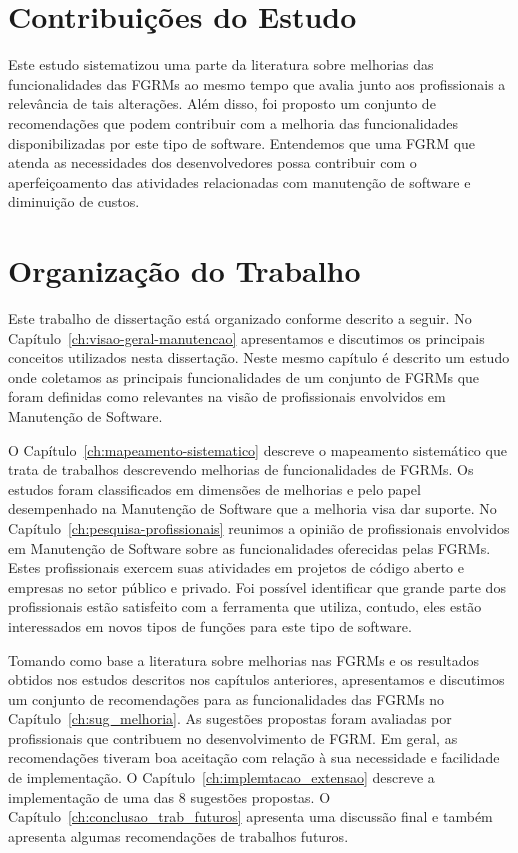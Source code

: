 \section{Contribuições do Estudo}
\label{sec:intro-contribuicao}

Este estudo sistematizou uma parte da literatura sobre melhorias das
funcionalidades das FGRMs ao mesmo tempo que avalia junto aos profissionais a
relevância de tais alterações. Além disso, foi proposto um conjunto de
recomendações que podem contribuir com a melhoria das funcionalidades
disponibilizadas por este tipo de software. Entendemos que uma FGRM que atenda
as necessidades dos desenvolvedores possa contribuir com o aperfeiçoamento das
atividades relacionadas com manutenção de software e diminuição de custos.

\section{Organização do Trabalho}
\label{sec:intro-organizacao-dissertacao}

Este trabalho de dissertação está organizado conforme descrito a seguir. No
Capítulo~\ref{ch:visao-geral-manutencao} apresentamos e discutimos os principais
conceitos utilizados nesta dissertação. Neste mesmo capítulo é descrito um
estudo onde coletamos as principais funcionalidades de um conjunto de FGRMs que
foram definidas como relevantes na visão de profissionais envolvidos em
Manutenção de Software.

O Capítulo~\ref{ch:mapeamento-sistematico} descreve o mapeamento sistemático que
trata de trabalhos descrevendo melhorias de funcionalidades de FGRMs. Os estudos
foram classificados em dimensões de melhorias e pelo papel desempenhado na
Manutenção de Software que a melhoria visa dar suporte.  No
Capítulo~\ref{ch:pesquisa-profissionais} reunimos a opinião de profissionais
envolvidos em Manutenção de Software sobre as funcionalidades oferecidas pelas
FGRMs. Estes profissionais exercem suas atividades em projetos de código aberto
e empresas no setor público e privado. Foi possível identificar que grande parte
dos profissionais estão satisfeito com a ferramenta que utiliza, contudo, eles
estão interessados em novos tipos de funções para este tipo de software.

Tomando como base a literatura sobre melhorias nas FGRMs e os resultados obtidos
nos estudos descritos nos capítulos anteriores, apresentamos e discutimos um
conjunto de recomendações para as funcionalidades das FGRMs no
Capítulo~\ref{ch:sug_melhoria}. As sugestões propostas foram avaliadas por
profissionais que contribuem no desenvolvimento de FGRM\@. Em geral, as
recomendações tiveram boa aceitação com relação à sua necessidade e facilidade
de implementação. O Capítulo~\ref{ch:implemtacao_extensao} descreve a
implementação de uma das 8 sugestões propostas. O
Capítulo~\ref{ch:conclusao_trab_futuros} apresenta uma discussão final e também
apresenta algumas recomendações de trabalhos futuros.
